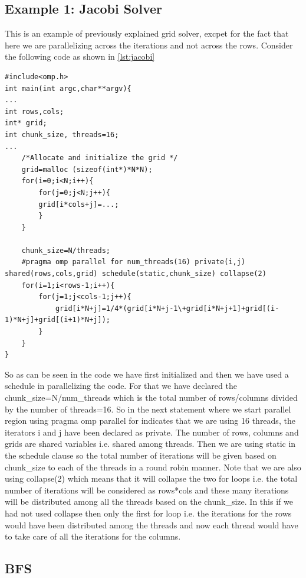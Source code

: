 \documentclass[12pt]{article}
\begin{document}
\subsection{Example 1: Jacobi Solver}
This is an example of previously explained grid solver, excpet for the fact that here we are parallelizing across the iterations and not across the rows. Consider the following code as shown in \ref{lst:jacobi}
\begin{lstlisting}[caption={jacobi-solver},captionpos=b,label={lst:jacobi}]
#include<omp.h>
int main(int argc,char**argv){
...
int rows,cols;
int* grid;
int chunk_size, threads=16;
...
    /*Allocate and initialize the grid */
    grid=malloc (sizeof(int*)*N*N);
    for(i=0;i<N;i++){
        for(j=0;j<N;j++){
        grid[i*cols+j]=...;
        }
    }

    chunk_size=N/threads;
    #pragma omp parallel for num_threads(16) private(i,j) shared(rows,cols,grid) schedule(static,chunk_size) collapse(2)
    for(i=1;i<rows-1;i++){
        for(j=1;j<cols-1;j++){
            grid[i*N+j]=1/4*(grid[i*N+j-1\+grid[i*N+j+1]+grid[(i-1)*N+j]+grid[(i+1)*N+j]);
        }
    }
}
\end{lstlisting}
So as can be seen in the code we have first initialized and then we have used a schedule in parallelizing the code.
For that we have declared the chunk\_size=N/num\_threads which is the total number of rows/columns divided by the number of threads=16. So in the next statement where we start parallel region using pragma omp parallel for indicates that we are using 16 threads, the iterators i and j have been declared as private. The number of rows, columns and grids are shared variables i.e. shared among threads. Then we are using static in the schedule clause so the total number of iterations will be given based on chunk\_size to each of the threads in a round robin manner. Note that we are also using collapse(2) which means that it will collapse the two for loops i.e. the total number of iterations will be considered as rows*cols and these many iterations will be distributed among all the threads based on the chunk\_size. In this if we had not used collapse then only the first for loop i.e. the iterations for the rows would have been distributed among the threads and now each thread would have to take care of all the iterations for the columns.

\subsection{BFS}
\end{document}
